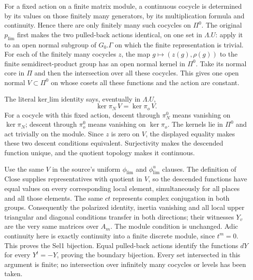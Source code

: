 For a fixed action on a finite matrix module, a continuous
cocycle is determined by its values on those finitely many
generators, by its multiplication formula and continuity.
Hence there are only finitely many such cocycles on $\Pi^0$.
The original $p_{\mathrm{lim}}$ first makes the two pulled-back
actions identical, on one set in $\Lambda.U$: apply it to
an open normal subgroup of $G_0.\Gamma$ on which the
finite representation is trivial.
For each of the finitely many cocycles $z$, the map
$g\mapsto(z(g),\rho(g))$ to the finite semidirect-product
group has an open normal kernel in $\Pi^0$.
Take its normal core in $\Pi$ and then the intersection
over all these cocycles.  This gives one open normal
$V\subset\Pi^0$ on whose cosets all these functions
and the action are constant.

The literal $\mathrm{ker\_lim}$ identity says, eventually
in $\Lambda.U$,
\[
 \ker\pi_N\,V=\ker\pi_o\,V.
\]
For a cocycle with this fixed action, descent through
$\pi_N^0$ means vanishing on $\ker\pi_N$; descent through
$\pi_o^0$ means vanishing on $\ker\pi_o$.
The kernels lie in $\Pi^0$ and act trivially on the module.
Since $z$ is zero on $V$, the displayed equality makes
these two descent conditions equivalent.
Surjectivity makes the descended function unique, and the
quotient topology makes it continuous.

Use the same $V$ in the source's uniform
$\phi_{\mathrm{lim}}$ and $\phi^u_{\mathrm{lim}}$ clauses.
The definition of $\mathrm{Close}$ supplies representatives
with quotient in $V$, so the descended functions have
equal values on every corresponding local element,
simultaneously for all places and all those elements.
The same $ct$ represents complex conjugation in both groups.
Consequently the polarized identity, inertia vanishing and
all local upper triangular and diagonal conditions transfer
in both directions; their witnesses $Y_v$ are the very same
matrices over $A_m$.  The module condition is unchanged.
Adic continuity here is exactly continuity into a finite
discrete module, since $t^m=0$.
This proves the Sel1 bijection.  Equal pulled-back actions
identify the functions $dY$ for every $Y^t=-Y$, proving the
boundary bijection.  Every set intersected in this argument
is finite; no intersection over infinitely many cocycles or
levels has been taken.

